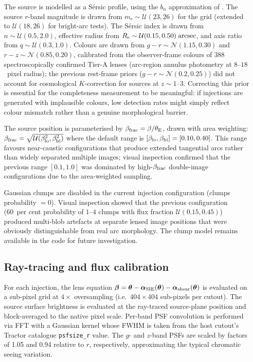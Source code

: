 \documentclass[fleqn,usenatbib]{mnras}
\begin{document}
The source is modelled as a S\'{e}rsic \citep{Sersic1968} profile, using the $b_n$ approximation of \citet{CiottiBertin1999}.  The source $r$-band magnitude is drawn from $m_r \sim \mathcal{U}(23, 26)$ for the grid (extended to $\mathcal{U}(18, 26)$ for bright-arc tests).  The S\'{e}rsic index is drawn from $n \sim \mathcal{U}(0.5, 2.0)$, effective radius from $R_{\rm e} \sim \mathcal{U}(0.15, 0.50)\;\mathrm{arcsec}$, and axis ratio from $q \sim \mathcal{U}(0.3, 1.0)$.  Colours are drawn from $g - r \sim \mathcal{N}(1.15, 0.30)$ and $r - z \sim \mathcal{N}(0.85, 0.20)$, calibrated from the observer-frame colours of 388 spectroscopically confirmed Tier-A lenses (arc-region annulus photometry at $8$--$18$~pixel radius); the previous rest-frame priors ($g - r \sim \mathcal{N}(0.2, 0.25)$) did not account for cosmological $K$-correction for sources at $z \sim 1$--$3$.  Correcting this prior is essential for the completeness measurement to be meaningful: if injections are generated with implausible colours, low detection rates might simply reflect colour mismatch rather than a genuine morphological barrier.

The source position is parameterised by $\beta_{\rm frac} = \beta / \theta_{\rm E}$, drawn with area weighting: $\beta_{\rm frac} = \sqrt{\mathcal{U}(\beta_{\rm lo}^{2}, \beta_{\rm hi}^{2})}$ where the default range is $[\beta_{\rm lo}, \beta_{\rm hi}] = [0.10, 0.40]$.  This range favours near-caustic configurations that produce extended tangential arcs rather than widely separated multiple images; visual inspection confirmed that the previous range $[0.1, 1.0]$ was dominated by high-$\beta_{\rm frac}$ double-image configurations due to the area-weighted sampling.

Gaussian clumps are disabled in the current injection configuration (clumps probability $= 0$).  Visual inspection showed that the previous configuration (60~per cent probability of $1$--$4$ clumps with flux fraction $\mathcal{U}(0.15, 0.45)$) produced multi-blob artefacts at separate lensed image positions that were obviously distinguishable from real arc morphology.  The clump model remains available in the code for future investigation.

\subsection{Ray-tracing and flux calibration}

For each injection, the lens equation $\boldsymbol{\beta} = \boldsymbol{\theta} - \boldsymbol{\alpha}_{\rm SIE}(\boldsymbol{\theta}) - \boldsymbol{\alpha}_{\rm shear}(\boldsymbol{\theta})$ is evaluated on a sub-pixel grid at $4\times$ oversampling (i.e.\ $404 \times 404$ sub-pixels per cutout).  The source surface brightness is evaluated at the ray-traced source-plane position and block-averaged to the native pixel scale.  Per-band PSF convolution is performed via FFT with a Gaussian kernel whose FWHM is taken from the host cutout's Tractor catalogue \texttt{psfsize\_r} value.  The $g$- and $z$-band PSFs are scaled by factors of 1.05 and 0.94 relative to $r$, respectively, approximating the typical chromatic seeing variation.
\end{document}
